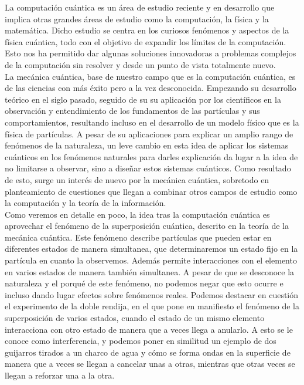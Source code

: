 \documentclass[a4paper]{article}
\numberwithin{equation}{section}
\begin{document}
La computación cuántica es un área de estudio reciente y en desarrollo que implica otras grandes áreas de estudio como la computación, la física y la matemática. Dicho estudio se centra en los curiosos fenómenos y aspectos de la física cuántica, todo con el objetivo de expandir los límites de la computación. Esto nos ha permitido dar algunas soluciones innovadoras a problemas complejos de la computación sin resolver y desde un punto de vista totalmente nuevo.\\
\linebreak
La mecánica cuántica, base de nuestro campo que es la computación cuántica, es de las ciencias con más éxito pero a la vez desconocida. Empezando su desarrollo teórico en el siglo pasado, seguido de su su aplicación por los científicos en la observación y entendimiento de los fundamentos de las partículas y sus comportamientos, resultando incluso en el desarrollo de un modelo físico que es la física de partículas. A pesar de su aplicaciones para explicar un amplio rango de fenómenos de la naturaleza, un leve cambio en esta idea de aplicar los sistemas cuánticos en los fenómenos naturales para darles explicación da lugar a la idea de no limitarse a observar, sino a diseñar estos sistemas cuánticos. Como resultado de esto, surge un interés de nuevo por la mecánica cuántica, sobretodo en planteamiento de cuestiones que llegan a combinar otros campos de estudio como la computación y la teoría de la información.\\
\linebreak
Como veremos en detalle en poco, la idea tras la computación cuántica es aprovechar el fenómeno de la superposición cuántica, descrito en la teoría de la mecánica cuántica. Este fenómeno describe partículas que pueden estar en diferentes estados de manera simultanea, que determinaremos un estado fijo en la partícula en cuanto la observemos. Además permite interacciones con el elemento en varios estados de manera también simultanea. A pesar de que se desconoce la naturaleza y el porqué de este fenómeno, no podemos negar que esto ocurre e incluso dando lugar efectos sobre fenómenos reales. Podemos destacar en cuestión el experimento de la doble rendija, en el que pone en manifiesto el fenómeno de la superposición de varios estados, cuando el estado de un mismo elemento interacciona con otro estado de manera que a veces llega a anularlo. A esto se le conoce como interferencia, y podemos poner en similitud un ejemplo de dos guijarros tirados a un charco de agua y cómo se forma ondas en la superficie de manera que a veces se llegan a cancelar unas a otras, mientras que otras veces se llegan a reforzar una a la otra.\\
\end{document}
